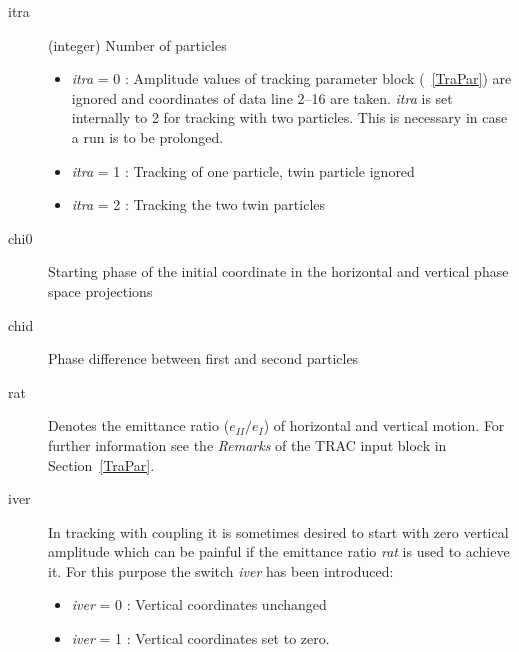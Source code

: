 \documentclass[a4paper,11pt]{report}
\begin{document}
\begin{description}
\item [itra] (integer) Number of particles
 \begin{itemize}
 \item {\em itra} \/= 0 : Amplitude values of tracking parameter block
   (~\ref{TraPar}) are ignored and coordinates of data line 2--16 are
   taken. {\em itra} \/is set internally to 2 for tracking with two
   particles.  This is necessary in case a run is to be prolonged.
 \item {\em itra} \/= 1 : Tracking of one particle, twin particle
   ignored
 \item {\em itra} \/= 2 : Tracking the two twin particles
 \end{itemize}
\item [chi0] Starting phase of the initial coordinate in the
  horizontal and vertical phase space projections
\item [chid] Phase difference between first and second particles
\item [rat] Denotes the emittance ratio ($e_{II}/e_I$) of horizontal
  and vertical motion. For further information see the \emph{Remarks} of the TRAC input block in Section~\ref{TraPar}.
\item [iver] In tracking with coupling it is sometimes desired to
  start with zero vertical amplitude which can be painful if the
  emittance ratio {\em rat} \/is used to achieve it. For this purpose
  the switch {\em iver} \/has been introduced:
\begin{itemize}
\item {\em iver} \/= 0 : Vertical coordinates unchanged
\item {\em iver} \/= 1 : Vertical coordinates set to zero.
\end{itemize}
\end{description}
\end{document}
